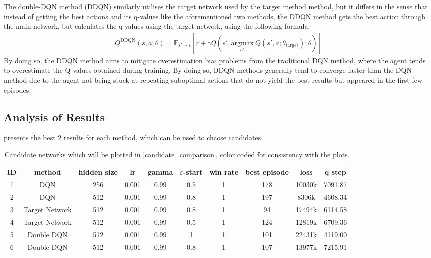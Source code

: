 The double-DQN method (DDQN) similarly utilises the target network used by the target method method, but it differs in the sense that instead of getting the best actions and its q-values like the aforementioned two methods, the DDQN method gets the best action through the main network, but calculates the q-values using the target network, using the following formula:
\begin{align*}
    Q^{\text{DDQN}}(s, a ; \theta) = \mathbb{E}_{s' \sim \varepsilon}[r + \gamma Q(s', \underset{a'}{\text{argmax}}\ Q(s', a ; \theta_{\text{target}}) ; \theta)]
\end{align*}
By doing so, the DDQN method aims to mitigate overestimation bias problems from the traditional DQN method, where the agent tends to overestimate the Q-values obtained during training. By doing so, DDQN methods generally tend to converge faster than the DQN method due to the agent not being stuck at repeating suboptimal actions that do not yield the best results but appeared in the first few episodes.

\subsection{Analysis of Results}

 presents the best 2 results for each method, which can be used to choose candidates.
\begin{table}[h]
	\centering
	\scriptsize
	\begin{tabular}{c c c c c c | c c c c}
		\toprule
		ID & method & hidden size & lr & gamma & $\varepsilon$-start & win rate & best episode & loss & q step \\
  \midrule
		\colorbox{id1}{1} & DQN & 256 & 0.001 & 0.99 & 0.5 & 1 & 178 & 10030k & 7091.87 \\
		\colorbox{id2}{2} & DQN & 512 & 0.001 & 0.99 & 0.8 & 1 & 197 & \phantom{0}8306k & 4608.34 \\
		\colorbox{id3}{3} & Target Network & 512 & 0.001 & 0.99 & 0.8 & 1 & \phantom{0}94 & 17494k & 6114.58 \\
		\colorbox{id4}{4} & Target Network & 512 & 0.001 & 0.99 & 0.5 & 1 & 124 & 12819k & 6709.36 \\
		\colorbox{id5}{5} & Double DQN & 512 & 0.001 & 0.99 & 1 & 1 & 101 & 22431k & 4119.00 \\
		\colorbox{id6}{6} & Double DQN & 512 & 0.001 & 0.99 & 0.8 & 1 & 107 & 13977k & 7215.91 \\
  \bottomrule
  \end{tabular}
	\caption{Candidate networks which will be plotted in \cref{candidate_comparison}, color coded for consistency with the plots.}
	\label{best_results_t2}
\end{table}

